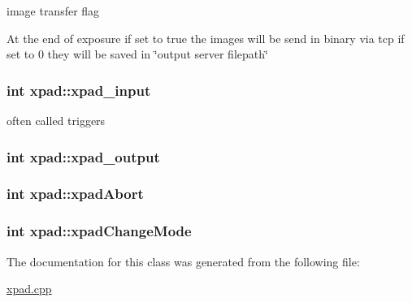image transfer flag 

\-At the end of exposure if set to true the images will be send in binary via tcp if set to 0 they will be saved in \char`\"{}output server filepath\char`\"{} \hypertarget{classxpad_a8f65d3ade5862e87afbe681372e7ab17}{
\subsubsection[{xpad\-\_\-input}]{\setlength{\rightskip}{0pt plus 5cm}int {\bf xpad\-::xpad\-\_\-input}}}\label{classxpad_a8f65d3ade5862e87afbe681372e7ab17}


often called triggers 

\hypertarget{classxpad_aff6cab8fd160aa9e9c1dbd4a2cb45fe6}{
\subsubsection[{xpad\-\_\-output}]{\setlength{\rightskip}{0pt plus 5cm}int {\bf xpad\-::xpad\-\_\-output}}}\label{classxpad_aff6cab8fd160aa9e9c1dbd4a2cb45fe6}
\hypertarget{classxpad_ae0a204dd249083d430c3df4f409f0904}{
\subsubsection[{xpad\-Abort}]{\setlength{\rightskip}{0pt plus 5cm}int {\bf xpad\-::xpad\-Abort}}}\label{classxpad_ae0a204dd249083d430c3df4f409f0904}
\hypertarget{classxpad_a55cbc1f3e75d5cd322863fb3c00f027c}{
\subsubsection[{xpad\-Change\-Mode}]{\setlength{\rightskip}{0pt plus 5cm}int {\bf xpad\-::xpad\-Change\-Mode}}}\label{classxpad_a55cbc1f3e75d5cd322863fb3c00f027c}


\-The documentation for this class was generated from the following file\-:\begin{DoxyCompactItemize}
\item 
\hyperlink{xpad_8cpp}{xpad.\-cpp}\end{DoxyCompactItemize}

